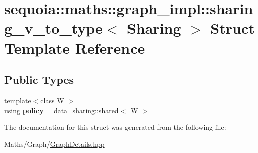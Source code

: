 \hypertarget{structsequoia_1_1maths_1_1graph__impl_1_1sharing__v__to__type}{}\section{sequoia\+::maths\+::graph\+\_\+impl\+::sharing\+\_\+v\+\_\+to\+\_\+type$<$ Sharing $>$ Struct Template Reference}
\label{structsequoia_1_1maths_1_1graph__impl_1_1sharing__v__to__type}
\subsection*{Public Types}
\begin{DoxyCompactItemize}
\item 
\mbox{\label{structsequoia_1_1maths_1_1graph__impl_1_1sharing__v__to__type_afee40657352db8c74fc34bcf6034defa}} 
{\footnotesize template$<$class W $>$ }\\using {\bfseries policy} = \mbox{\hyperlink{structsequoia_1_1data__sharing_1_1shared}{data\+\_\+sharing\+::shared}}$<$ W $>$
\end{DoxyCompactItemize}


The documentation for this struct was generated from the following file\+:\begin{DoxyCompactItemize}
\item 
Maths/\+Graph/\mbox{\hyperlink{_graph_details_8hpp}{Graph\+Details.\+hpp}}\end{DoxyCompactItemize}
